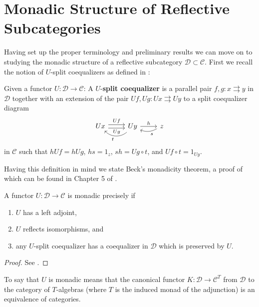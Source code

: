 \section{Monadic Structure of Reflective Subcategories} %
\label{sec:Monadic Structure of Reflective Subcategories}
Having set up the proper terminology and preliminary results we can move on to studying the monadic structure of a reflective subcategory $ \mathcal{D} \subset \mathcal{C} $. First we recall the notion of $ U $-split coequalizers as defined in \cite{riehl2017category}:
\begin{definition}
  Given a functor $ U: \mathcal{D} \to \mathcal{C} $:
    A $ U $-\textbf{split coequalizer} is a parallel pair $ f,g:x \rightrightarrows y $ in $ \mathcal{D} $ together with an extension of the pair $ Uf, Ug: Ux \rightrightarrows Uy $ to a split coequalizer diagram
      \[\begin{tikzcd}
	      Ux & Uy & z
	      \arrow["h", from=1-2, to=1-3]
	      \arrow["s", bend left=25, from=1-3, to=1-2]
	      \arrow["Uf", shift left, from=1-1, to=1-2]
	      \arrow["Ug"', shift right, from=1-1, to=1-2]
	      \arrow["t", bend left=45, from=1-2, to=1-1]
      \end{tikzcd}\]
      in $ \mathcal{C} $ such that $ hUf = hUg $, $ hs=1_z $, $ sh = Ug \circ t $, and $ Uf\circ t = 1_{Uy} $.
\end{definition}

\noindent Having this definition in mind we state Beck's monadicity theorem, a proof of which can be found in Chapter 5 of \cite{riehl2017category}.
\begin{theorem}
  \label{thm:beck}
  A functor $ U: \mathcal{D} \to \mathcal{C} $ is monadic precisely if
  \begin{enumerate}[label=(\arabic*)]
    \item $ U $ has a left adjoint,
    \item $ U $ reflects isomorphisms, and
    \item any $ U $-split coequalizer has a coequalizer in $ \mathcal{D} $ which is preserved by $ U $.
  \end{enumerate}
\end{theorem}
\begin{proof}
  See \cite{riehl2017category}.
\end{proof}

To say that $ U $ is monadic means that the canonical functor $ K: \mathcal{D} \to \mathcal{C}^{T} $ from $ \mathcal{D} $ to the category of $ T $-algebras (where $ T $ is the induced monad of the adjunction) is an equivalence of categories.

